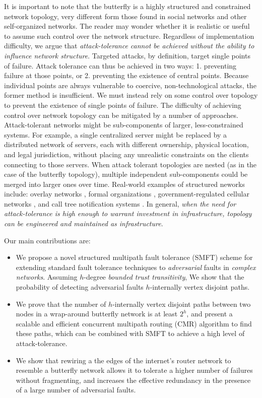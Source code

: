 \documentclass[10pt,letterpaper]{article}
\begin{document}
It is important to note that the butterfly is a highly structured and constrained
network topology,
very different form those found in social networks and other
self-organized networks.
The reader may wonder whether it is realistic or useful to assume such control over
the network structure.
Regardless of implementation difficulty,
we argue that {\em attack-tolerance cannot be achieved without the ability to influence
network structure}.
Targeted attacks, by definition, target single points of failure.
Attack tolerance can thus be achieved in two ways: 1. preventing failure at
those points, or 2. preventing the existence of central points.
Because individual points are always vulnerable to coercive, non-technological
attacks, the former method is insufficient.
We must instead rely on some control over topology to prevent the existence of
single points of failure.
The difficulty of achieving control over network topology can be mitigated by
a number of approaches.
Attack-tolerant networks might be sub-components of
larger, less-constrained systems.
For example, a single centralized server might be replaced by a distributed
network of servers,
each with different ownership, physical location, and legal jurisdiction,
without placing any unrealistic constraints on the clients connecting to
those servers.
When attack tolerant topologies are nested (as in the case of the butterfly
topology), multiple independent sub-components could be merged into larger
ones over time.
Real-world examples of structured neworks include: overlay networks
\cite{lua_survey_2005, korzun_structured_2013},
formal organizations \cite{mohr_explaining_1982},
government-regulated cellular networks \cite{walker_mass_2012},
and call tree notification systems \cite{nickerson_thinking_2010}.
In general,
{\em when the need for attack-tolerance is high enough to warrant investment
in infrastructure, topology can be engineered and maintained as infrastructure}.

Our main contributions are:
\begin{itemize}
\item{
We propose a novel structured multipath fault tolerance (SMFT) scheme
for extending standard fault tolerance techniques to
{\em adversarial} faults in {\em complex networks}.
Assuming $h$-degree {\em bounded trust transitivity},
We show that the probability of detecting adversarial faults
$h$-internally vertex disjoint paths.
}
\item{We prove that the number of $h$-internally vertex disjoint
paths between two nodes in a wrap-around butterfly network
is at least $2^h$,
and present a scalable and efficient concurrent multipath routing (CMR) algorithm
to find these paths,
which can be combined with SMFT to achieve a high level of attack-tolerance.
}
\item{We show that rewiring a the edges of the internet's router network to
resemble a butterfly network allows it to tolerate a higher number of failures
without fragmenting, and increases the effective redundancy in the presence
of a large number of adversarial faults.}
\end{itemize}
\end{document}
